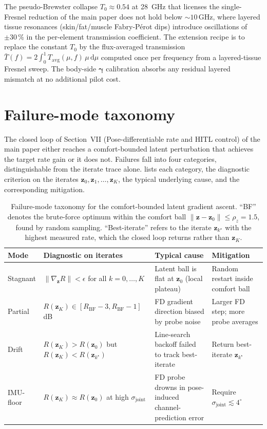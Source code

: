 \documentclass[10pt,journal,twocolumn]{IEEEtran}
\newcommand{\gammab}{\bm{\gamma}}
\newcommand{\Tepskin}{T_{0}}
\newcommand{\diff}{\mathrm{d}}
\theoremstyle{plain}
\theoremstyle{definition}
\begin{document}
The pseudo-Brewster collapse $\Tepskin \approx 0.54$ at 28~GHz that
licenses the single-Fresnel reduction of the main paper does not
hold below $\sim 10\,$GHz, where layered tissue resonances
(skin/fat/muscle Fabry-Pérot dips) introduce oscillations of
$\pm 30\,\%$ in the per-element transmission coefficient. The
extension recipe is to replace the constant $\Tepskin$ by the
flux-averaged transmission
$\bar{T}(f) = 2\int_0^1 T_\mathrm{avg}(\mu, f)\,\mu\,\diff\mu$
computed once per frequency from a layered-tissue Fresnel sweep.
The body-side $\gammab$ calibration absorbs any residual layered
mismatch at no additional pilot cost.

\section{Failure-mode taxonomy}\label{si:failure-modes}

The closed loop of Section~VII (Pose-differentiable rate and HITL control) of the main paper either
reaches a comfort-bounded latent perturbation that achieves the
target rate gain or it does not. Failures fall into four categories,
distinguishable from the iterate trace alone.
 lists each category, the diagnostic
criterion on the iterates $\bm{z}_0, \bm{z}_1, \ldots, \bm{z}_K$,
the typical underlying cause, and the corresponding mitigation.

\begin{table}[!t]
\centering
\caption{Failure-mode taxonomy for the comfort-bounded latent
gradient ascent. ``BF'' denotes the brute-force optimum within the
comfort ball $\|\bm{z} - \bm{z}_0\| \leq \rho_z = 1.5$, found by
random sampling. ``Best-iterate'' refers to the iterate
$\bm{z}_{k^\star}$ with the highest measured rate, which the closed
loop returns rather than $\bm{z}_K$.}
\label{tab:failure-modes}
\footnotesize
\begin{tabular}{@{}llll@{}}
\toprule
Mode & Diagnostic on iterates & Typical cause & Mitigation \\
\midrule
Stagnant
  & $\|\nabla_{\bm{z}} R\| < \epsilon$ for all $k = 0, \ldots, K$
  & Latent ball is flat at $\bm{z}_0$ (local plateau)
  & Random restart inside comfort ball \\[2pt]
Partial
  & $R(\bm{z}_K) \in [R_\mathrm{BF} - 3, R_\mathrm{BF} - 1]\,$dB
  & FD gradient direction biased by probe noise
  & Larger FD step; more probe averages \\[2pt]
Drift
  & $R(\bm{z}_K) > R(\bm{z}_0)$ but $R(\bm{z}_K) < R(\bm{z}_{k^\star})$
  & Line-search backoff failed to track best-iterate
  & Return best-iterate $\bm{z}_{k^\star}$ \\[2pt]
IMU-floor
  & $R(\bm{z}_K) \approx R(\bm{z}_0)$ at high $\sigma_\mathrm{joint}$
  & FD probe drowns in pose-induced channel-prediction error
  & Require $\sigma_\mathrm{joint} \lesssim 4^{\circ}$ \\
\bottomrule
\end{tabular}
\end{table}
\end{document}
